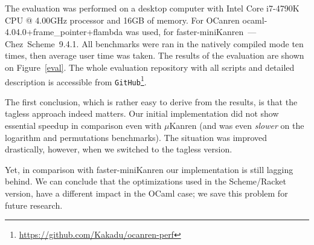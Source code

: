
The evaluation was performed on a desktop computer with Intel Core i7-4790K CPU @ 4.00GHz processor and 16GB of memory.
For OCanren \mbox{ocaml-4.04.0+frame_pointer+flambda} was used, for faster-miniKanren~--- Chez~Scheme~9.4.1.
All benchmarks were ran in the natively compiled mode ten times, then average user time was taken. The results of the evaluation
are shown on Figure~\ref{eval}. The whole evaluation repository with all scripts and detailed description is accessible 
from \lstinline{GitHub}\footnote{\url{https://github.com/Kakadu/ocanren-perf}}.

The first conclusion, which is rather easy to derive from the results, is that the tagless approach indeed matters. Our initial
implementation did not show essential speedup in comparison even with $\mu$Kanren (and was even \emph{slower} on the logarithm
and permutations benchmarks). The situation was improved drastically, however, when we switched to the tagless version.

Yet, in comparison with faster-miniKanren our implementation is still lagging behind. We can conclude that the optimizations
used in the Scheme/Racket version, have a different impact in the OCaml case; we save this problem for future research.

